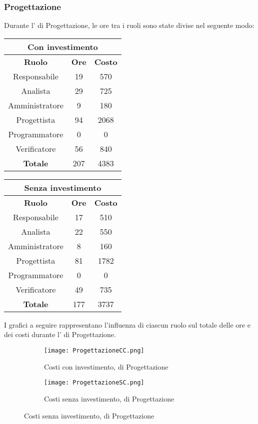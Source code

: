 \documentclass{scalatekids-article}
\begin{document}
\subsubsection{Progettazione}
Durante l' di Progettazione, le ore tra i ruoli sono state divise nel seguente modo:
\begin{center}
  \normalsize
  \begin{tabular}{| c | c | c |}
    \hline
    \multicolumn{3}{|c|}{\textbf{Con investimento}}\\
    \hline
    \textbf{Ruolo} & \textbf{Ore} & \textbf{Costo}\\
    \hline
    Responsabile & 19 & 570 \\
    Analista & 29 & 725 \\
    Amministratore & 9 & 180 \\
    Progettista & 94 & 2068\\
    Programmatore & 0 & 0\\
    Verificatore & 56 & 840 \\
    \hline
    \textbf{Totale} & 207 & 4383\\
    \hline
  \end{tabular}
  \qquad
  \begin{tabular}{| c | c | c |}
    \hline
    \multicolumn{3}{|c|}{\textbf{Senza investimento}}\\
    \hline
    \textbf{Ruolo} & \textbf{Ore} & \textbf{Costo}\\
    \hline
    Responsabile & 17 & 510\\
    Analista & 22 & 550\\
    Amministratore & 8 & 160\\
    Progettista & 81 & 1782\\
    Programmatore & 0 & 0\\
    Verificatore & 49 & 735\\
    \hline
    \textbf{Totale} & 177 & 3737 \\
    \hline
  \end{tabular}
\end{center}
I grafici a seguire rappresentano l'influenza di ciascun ruolo sul totale delle ore e dei costi durante l' di Progettazione.
\begin{figure}[H]
  \begin{subfigure}[H]{0.47\textwidth}
    \texttt{[image: ProgettazioneCC.png]}
    \caption{Costi con investimento,  di Progettazione}
  \end{subfigure}
  \qquad
  \begin{subfigure}[H]{0.47\textwidth}
    \texttt{[image: ProgettazioneSC.png]}
    \caption{Costi senza investimento,  di Progettazione}
  \end{subfigure}
\end{figure}
\newpage
\end{document}
